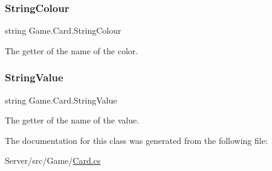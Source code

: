 \subsubsection{\texorpdfstring{String\+Colour}{StringColour}}
{\footnotesize\ttfamily string Game.\+Card.\+String\+Colour\hspace{0.3cm}{\ttfamily [get]}}

The getter of the name of the color. \mbox{\label{class_game_1_1_card_aa0426a552479da58e7965a9d0fd3f1fd}} 
\subsubsection{\texorpdfstring{String\+Value}{StringValue}}
{\footnotesize\ttfamily string Game.\+Card.\+String\+Value\hspace{0.3cm}{\ttfamily [get]}}

The getter of the name of the value. 

The documentation for this class was generated from the following file\+:\begin{DoxyCompactItemize}
\item 
Server/src/\+Game/\hyperlink{_card_8cs}{Card.\+cs}\end{DoxyCompactItemize}
